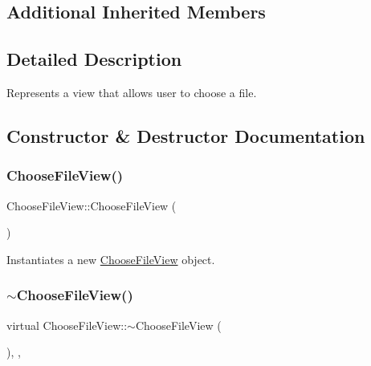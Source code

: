 \subsection*{Additional Inherited Members}


\subsection{Detailed Description}
Represents a view that allows user to choose a file. 



\subsection{Constructor \& Destructor Documentation}
\mbox{\label{class_choose_file_view_a49d02999d2bff55a4d9716987a7f2e5f}} 
\subsubsection{\texorpdfstring{ChooseFileView()}{ChooseFileView()}}
{\footnotesize\ttfamily Choose\+File\+View\+::\+Choose\+File\+View (\begin{DoxyParamCaption}{ }\end{DoxyParamCaption})}



Instantiates a new \mbox{\hyperlink{class_choose_file_view}{Choose\+File\+View}} object. 

\mbox{\label{class_choose_file_view_aafd296eee3a027b1c71affb339dd66a4}} 
\subsubsection{\texorpdfstring{$\sim$ChooseFileView()}{~ChooseFileView()}}
{\footnotesize\ttfamily virtual Choose\+File\+View\+::$\sim$\+Choose\+File\+View (\begin{DoxyParamCaption}{ }\end{DoxyParamCaption})\hspace{0.3cm}{\ttfamily [inline]}, {\ttfamily [override]}, {\ttfamily [virtual]}}



